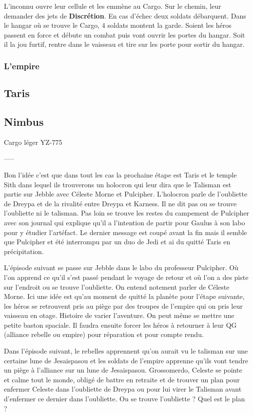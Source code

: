 L'inconnu ouvre leur cellule et les emmène au Cargo. Sur le chemin, leur demander des jets de \textbf{Discrétion}. En cas d'échec deux soldats débarquent. Dans le hangar où se trouve le Cargo, 4 soldats montent la garde. Soient les héros passent en force et débute un combat puis vont ouvrir les portes du hangar. Soit il la jou furtif, rentre dans le vaisseau et tire sur les porte pour sortir du hangar.



\subsubsection{L’empire} \label{sec:l-empire}

\subsection{Taris} \label{sec:taris}

\subsection{Nimbus} \label{sec:nimbus}
Cargo léger YZ-775

-----


Bon l'idée c'est que dans tout les cas la prochaine étape est Taris et le temple Sith dans lequel ils trouverons un holocron qui leur dira que le Talisman est partie sur Jebble avec Céleste Morne et Pulcipher.
L'holocron parle de l'oubliette de Dreypa et de la rivalité entre Dreypa et Karness. Il ne dit pas ou se trouve l'oubliette ni le talisman. 
Pas loin se trouve les restes du campement de Pulcipher avec son journal qui explique qu'il a l'intention de partir pour Gaulus à son labo pour y étudier l'artéfact. Le dernier message est coupé avant la fin mais il semble que Pulcipher et été interrompu par un duo de Jedi et ai du quitté Taris en précipitation.


L'épisode suivant se passe sur Jebble dans le labo du professeur Pulcipher. Où l'on apprend ce qu'il s'est passé pendant le voyage de retour et où l'on a des piste sur l'endroit ou se trouve l'oubliette. On entend notement parler de Céleste Morne.
Ici une idée est qu'au moment de quitté la planète pour l'étape suivante, les héros se retrouvent pris au piège par des troupes de l'empire qui on pris leur vaisseau en otage. Histoire de varier l'aventure. On peut même se mettre une petite baston spaciale.
Il faudra ensuite forcer les héros à retourner à leur QG (alliance rebelle ou empire) pour réparation et pour compte rendu.

Dans l'épisode suivant, le rebelles apprennent qu'on aurait vu le talisman sur une certaine lune de Jesaispasou et les soldats de l'empire apprenne qu'ils vont tendre un piège à l'alliance sur un lune de Jesaispasou.
Grossomerdo, Celeste se pointe et calme tout le monde, obligé de battre en retraite et de trouver un plan pour enfermer Celeste dans l'oubliette de Dreypa ou pour lui virer le Talisman avant d'enfermer ce dernier dans l'oubliette. Ou se trouve l'oubliette ? Quel est le plan ?